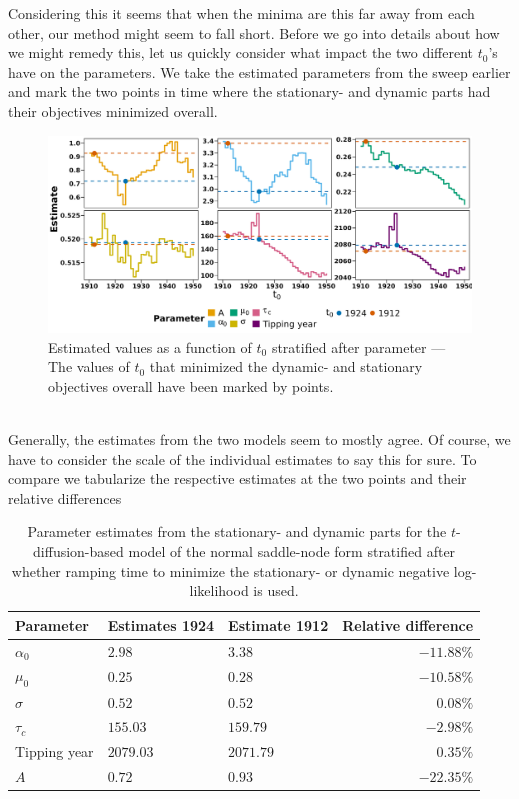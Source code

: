 Considering this it seems that when the minima are this far away from each other, our method might seem to fall short. Before we go into details about how we might remedy this, let us quickly consider what impact the two different $t_0$'s have on the parameters. We take the estimated parameters from the sweep earlier and mark the two points in time where the stationary- and dynamic parts had their objectives minimized overall.
\begin{figure}[h!]
    \begin{center}
        \includegraphics[scale = .09]{figures/estimators_full_plot.jpeg}
        \caption{Estimated values as a function of $t_0$ stratified after parameter — The values of $t_0$ that minimized the dynamic- and stationary objectives overall have been marked by points.}
    \end{center}
    \label{figure:AMOC_estimates_t_0}
\end{figure}\\
Generally, the estimates from the two models seem to mostly agree. Of course, we have to consider the scale of the individual estimates to say this for sure. To compare we tabularize the respective estimates at the two points and their relative differences
\begin{table}[h!]
    \centering
    \begin{tabular}{lllr}
     Parameter & Estimates 1924 & Estimate 1912 & Relative difference \\ \hline
    $\alpha_0$ & $2.98$ & 3$.38$ & $-11.88\%$ \\ 
      $\mu_0$ & $0.25$ & $0.28$ & $-10.58\%$ \\ 
      $\sigma$ & $0.52$ & $0.52$ & 0$.08\%$ \\ 
      $\tau_c$ & $155.03$ & $159.79$ & $-2.98\%$ \\ 
      Tipping year & $2079.03$ & $2071.79$ & $0.35\%$\\ 
      $A$ & $0.72$ & $0.93$ & $-22.35\%$ \\ 
       \hline
    \end{tabular}
    \caption{Parameter estimates from the stationary- and dynamic parts for the $t$-diffusion-based model of the normal saddle-node form stratified after whether ramping time to minimize the stationary- or dynamic negative log-likelihood is used.}
    \label{table:Estimates_t0_AMOC}
\end{table}\\
